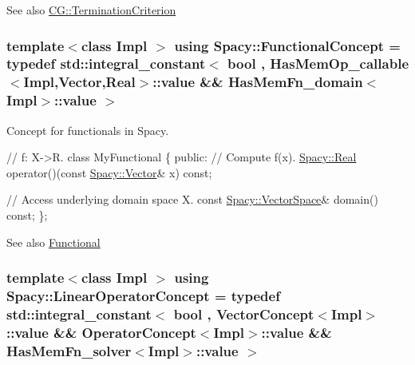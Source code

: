 \begin{DoxySeeAlso}{See also}
\hyperlink{classSpacy_1_1CG_1_1TerminationCriterion}{C\+G\+::\+Termination\+Criterion} 
\end{DoxySeeAlso}
\hypertarget{group__ConceptGroup_gae45328d2e01ef6c8e5d948b69fda385f}{}
\subsubsection[{Functional\+Concept}]{\setlength{\rightskip}{0pt plus 5cm}template$<$class Impl $>$ using {\bf Spacy\+::\+Functional\+Concept} = typedef std\+::integral\+\_\+constant$<$ bool , Has\+Mem\+Op\+\_\+callable$<$Impl,Vector,Real$>$\+::value \&\& Has\+Mem\+Fn\+\_\+domain$<$Impl$>$\+::value $>$}\label{group__ConceptGroup_gae45328d2e01ef6c8e5d948b69fda385f}


Concept for functionals in Spacy. 

\label{group__ConceptGroup_FunctionalConceptGroup}%
\hypertarget{group__ConceptGroup_FunctionalConceptGroup}{}%

\begin{DoxyCode}
\textcolor{comment}{// f: X->R.}
\textcolor{keyword}{class }MyFunctional
\{
\textcolor{keyword}{public}:
  \textcolor{comment}{// Compute f(x).}
  \hyperlink{classSpacy_1_1Real}{Spacy::Real} operator()(\textcolor{keyword}{const} \hyperlink{classSpacy_1_1Vector}{Spacy::Vector}& x) \textcolor{keyword}{const};

  \textcolor{comment}{// Access underlying domain space X.}
  \textcolor{keyword}{const} \hyperlink{classSpacy_1_1VectorSpace}{Spacy::VectorSpace}& domain() \textcolor{keyword}{const};
\};
\end{DoxyCode}
 \begin{DoxySeeAlso}{See also}
\hyperlink{classSpacy_1_1Functional}{Functional} 
\end{DoxySeeAlso}
\hypertarget{group__ConceptGroup_ga8d3bdfc9abd844ab446a31fcd3f8ef8c}{}
\subsubsection[{Linear\+Operator\+Concept}]{\setlength{\rightskip}{0pt plus 5cm}template$<$class Impl $>$ using {\bf Spacy\+::\+Linear\+Operator\+Concept} = typedef std\+::integral\+\_\+constant$<$ bool , Vector\+Concept$<$Impl$>$\+::value \&\& Operator\+Concept$<$Impl$>$\+::value \&\& Has\+Mem\+Fn\+\_\+solver$<$Impl$>$\+::value $>$}\label{group__ConceptGroup_ga8d3bdfc9abd844ab446a31fcd3f8ef8c}
\label{group__ConceptGroup_LinearOperatorConceptAnchor}%
\hypertarget{group__ConceptGroup_LinearOperatorConceptAnchor}{}%
 

